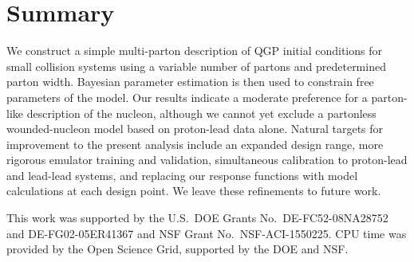 \documentclass[3p,times,procedia]{elsarticle}
\begin{document}
\section{Summary}
We construct a simple multi-parton description of QGP initial conditions for small collision systems using a variable number of partons and predetermined parton width.
Bayesian parameter estimation is then used to constrain free parameters of the model.
Our results indicate a moderate preference for a parton-like description of the nucleon, although we cannot yet exclude a partonless wounded-nucleon model based on proton-lead data alone.
Natural targets for improvement to the present analysis include an expanded design range, more rigorous emulator training and validation, simultaneous calibration to proton-lead and lead-lead systems, and replacing our response functions with model calculations at each design point.
We leave these refinements to future work.

This work was supported by the U.S.\ DOE Grants No.\ DE-FC52-08NA28752 and DE-FG02-05ER41367 and NSF Grant No.\ NSF-ACI-1550225. CPU time was provided by the Open Science Grid, supported by the DOE and NSF. 








%
%
%
\end{document}

